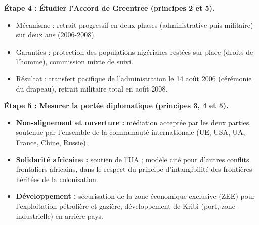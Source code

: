 \documentclass[11pt]{article}
\begin{document}
\begin{experience}
\textbf{Étape 4 : Étudier l'Accord de Greentree (principes 2 et 5).}
\begin{itemize}
    \item Mécanisme : retrait progressif en deux phases (administrative puis militaire) sur deux ans (2006-2008).
    \item Garanties : protection des populations nigérianes restées sur place (droits de l'homme), commission mixte de suivi.
    \item Résultat : transfert pacifique de l'administration le 14 août 2006 (cérémonie du drapeau), retrait militaire total en août 2008.
\end{itemize}

\textbf{Étape 5 : Mesurer la portée diplomatique (principes 3, 4 et 5).}
\begin{itemize}
    \item \textbf{Non-alignement et ouverture :} médiation acceptée par les deux parties, soutenue par l'ensemble de la communauté internationale (UE, USA, UA, France, Chine, Russie).
    \item \textbf{Solidarité africaine :} soutien de l'UA ; modèle cité pour d'autres conflits frontaliers africains, dans le respect du principe d'intangibilité des frontières héritées de la colonisation.
    \item \textbf{Développement :} sécurisation de la zone économique exclusive (ZEE) pour l'exploitation pétrolière et gazière, développement de Kribi (port, zone industrielle) en arrière-pays.
\end{itemize}
\end{experience}
\end{document}
